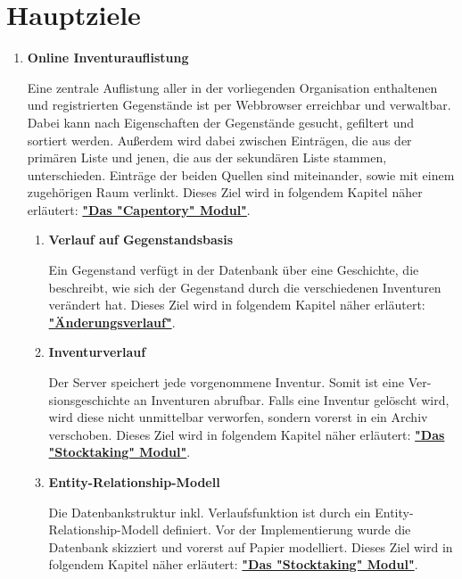 \documentclass[
    headings=optiontotocandhead,%
    twoside,
    numbers=noenddot,%
    toc=flat, %
    12pt, %
    titlepage, %
    parskip=full, %
    listof=totoc, %
    listof=flat, %
    numbers=noenddot, %
    bibliography=totoc, %
    a4paper,DIV=14,
    BCOR=15mm,
]{scrbook}
\begin{document}
\section{Hauptziele}

\begin{enumerate}


\item \textbf{Online Inventurauflistung}

Eine zentrale Auflistung aller in der vorliegenden Organisation enthaltenen und registrierten Gegenstände ist per Webbrowser erreichbar und verwaltbar. Dabei kann nach Eigenschaften der Gegenstände gesucht, gefiltert und sortiert werden. Außerdem wird dabei zwischen Einträgen, die aus der primären Liste und jenen, die aus der sekundären Liste stammen, unterschieden. Einträge der beiden Quellen sind miteinander, sowie mit einem zugehörigen Raum verlinkt. 
Dieses Ziel wird in folgendem Kapitel näher erläutert: \textbf{\hyperref[das-capentory-modul]{"Das "Capentory" Modul"}}.

\begin{enumerate}
  \item	\textbf{Verlauf auf Gegenstandsbasis}

  Ein Gegenstand verfügt in der Datenbank über eine Geschichte, die beschreibt, wie sich der Gegenstand durch die verschiedenen Inventuren verändert hat.
  Dieses Ziel wird in folgendem Kapitel näher erläutert: \textbf{\hyperref[uxe4nderungsverlauf]{"Änderungsverlauf"}}.

  \item	\textbf{Inventurverlauf}

  Der Server speichert jede vorgenommene Inventur. Somit ist eine Ver-sionsgeschichte an Inventuren abrufbar. Falls eine Inventur gelöscht wird, wird diese nicht unmittelbar verworfen, sondern vorerst in ein Archiv verschoben.
  Dieses Ziel wird in folgendem Kapitel näher erläutert: \textbf{\hyperref[das-stocktaking-modul]{"Das "Stocktaking" Modul"}}.
  
  \item	\textbf{Entity-Relationship-Modell}

  Die Datenbankstruktur inkl. Verlaufsfunktion ist durch ein Entity-Relationship-Modell definiert. Vor der Implementierung wurde die Datenbank skizziert und vorerst auf Papier modelliert. 
  Dieses Ziel wird in folgendem Kapitel näher erläutert: \textbf{\hyperref[das-stocktaking-modul]{"Das "Stocktaking" Modul"}}.
\end{enumerate}




\end{enumerate}
\end{document}
